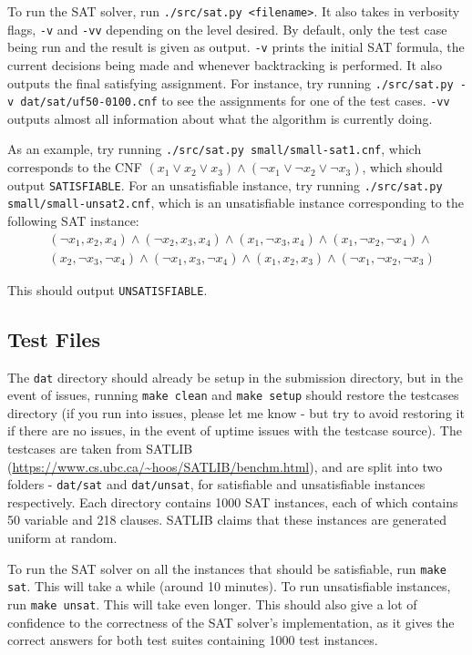 \documentclass[11pt]{article}
\begin{document}
To run the SAT solver, run \texttt{./src/sat.py <filename>}. It also takes in verbosity flags, \texttt{-v} and \texttt{-vv} depending on the level desired. By default, only the test case being run and the result is given as output. \texttt{-v} prints the initial SAT formula, the current decisions being made and whenever backtracking is performed. It also outputs the final satisfying assignment. For instance, try running \texttt{./src/sat.py -v dat/sat/uf50-0100.cnf} to see the assignments for one of the test cases. \texttt{-vv} outputs almost all information about what the algorithm is currently doing.

As an example, try running \texttt{./src/sat.py small/small-sat1.cnf}, which corresponds to the CNF $(x_1 \vee x_2 \vee x_3) \wedge (\neg x_1 \vee \neg x_2 \vee \neg x_3)$, which should output \texttt{SATISFIABLE}. For an unsatisfiable instance, try running \texttt{./src/sat.py small/small-unsat2.cnf}, which is an unsatisfiable instance corresponding to the following SAT instance:
\begin{align*}
& (\neg x_1,  x_2,  x_4) \wedge
(\neg x_2,  x_3,  x_4) \wedge
( x_1, \neg x_3,   x_4)  \wedge
( x_1, \neg x_2, \neg x_4)  \wedge \\
& ( x_2, \neg x_3, \neg x_4)  \wedge
(\neg x_1,   x_3, \neg x_4)  \wedge
(  x_1,  x_2,   x_3)  \wedge
(\neg x_1, \neg x_2, \neg x_3)  
\end{align*}

This should output \texttt{UNSATISFIABLE}.

\subsection{Test Files}

The \texttt{dat} directory should already be setup in the submission directory, but in the event of issues, running \texttt{make clean} and \texttt{make setup} should restore the testcases directory (if you run into issues, please let me know - but try to avoid restoring it if there are no issues, in the event of uptime issues with the testcase source). The testcases are taken from SATLIB (\url{https://www.cs.ubc.ca/~hoos/SATLIB/benchm.html}), and are split into two folders - \texttt{dat/sat} and \texttt{dat/unsat}, for satisfiable and unsatisfiable instances respectively. Each directory contains 1000 SAT instances, each of which contains 50 variable and 218 clauses. SATLIB claims that these instances are generated uniform at random.

To run the SAT solver on all the instances that should be satisfiable, run \texttt{make sat}. This will take a while (around 10 minutes). To run unsatisfiable instances, run \texttt{make unsat}. This will take even longer. This should also give a lot of confidence to the correctness of the SAT solver's implementation, as it gives the correct answers for both test suites containing 1000 test instances.
\end{document}
